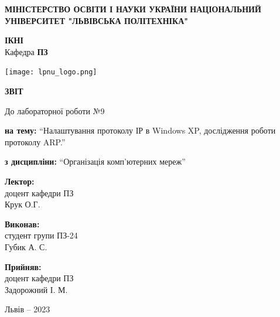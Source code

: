\documentclass[12pt]{extarticle}
\begin{document}
\begin{titlepage}
    \begin{center}
        \textbf{\normalsize{\MakeUppercase{
            Міністерство Освіти і науки України
            Національний університет "Львівська політехніка"
        }}}

        \begin{flushright}
        \textbf{ІКНІ}\\
        Кафедра \textbf{ПЗ}
        \end{flushright}
        \vspace{15mm}

        \texttt{[image: lpnu\_logo.png]}

        \vspace*{\fill}

        \textbf{\normalsize{\MakeUppercase{Звіт}}}
            
        До лабораторної роботи №9

        \textbf{на тему:} “Налаштування протоколу ІР в Windows XP, дослідження роботи протоколу
        ARP.”

        \textbf{з дисципліни:} “Організація комп'ютерних мереж”
            
        \vspace*{\fill}

        \begin{flushright}

            \textbf{Лектор:}\\
            доцент кафедри ПЗ\\
            Крук О.Г.\\
            \vspace{12pt}

            \textbf{Виконав:}\\
            студент групи ПЗ-24\\
            Губик А. С.\\
            \vspace{12pt}

            \textbf{Прийняв:}\\
            доцент кафедри ПЗ\\
            Задорожний І. М.\\
        \vspace{12pt}
        \end{flushright}

        Львів -- 2023
            
            
    \end{center}
\end{titlepage}
\end{document}
